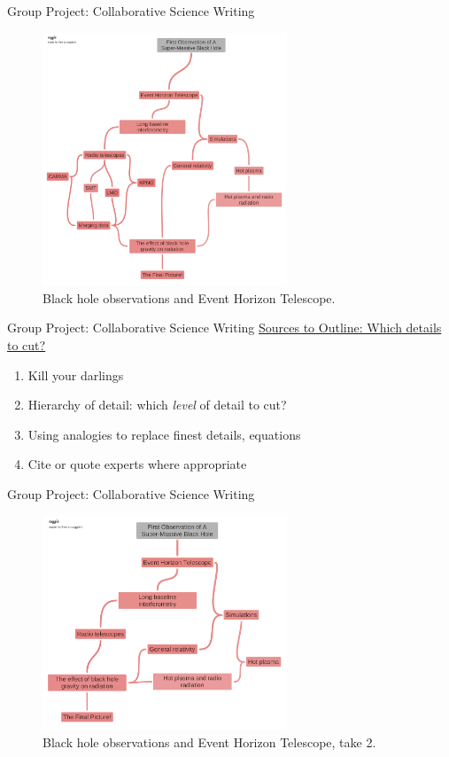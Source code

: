\documentclass{beamer}
\begin{document}
\begin{frame}{Group Project: Collaborative Science Writing}
\begin{figure}
\includegraphics[width=0.65\textwidth]{figures/blackhole.pdf}
\caption{\label{fig:black} Black hole observations and Event Horizon Telescope.}
\end{figure}
\end{frame}

\begin{frame}{Group Project: Collaborative Science Writing}
\underline{Sources to Outline: Which details to cut?}
\begin{enumerate}
\item Kill your darlings
\item Hierarchy of detail: which \textit{level} of detail to cut?
\item Using analogies to replace finest details, equations
\item Cite or quote experts where appropriate
\end{enumerate}
\end{frame}

\begin{frame}{Group Project: Collaborative Science Writing}
\begin{figure}
\includegraphics[width=0.65\textwidth]{figures/blackhole2.pdf}
\caption{\label{fig:black2} Black hole observations and Event Horizon Telescope, take 2.}
\end{figure}
\end{frame}
\end{document}
